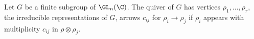 \begin{dfn}[\mc Quiver]
Let $G$ be a finite subgroup of $\GL_n(\C)$. The \mc quiver of $G$ has vertices $\rho_1,\ldots,\rho_r$, the irreducible representations of $G$, arrows $c_{ij}$ for $\rho_i \to \rho_j$ if $\rho_i$ appears with multiplicity $c_{ij}$ in $\rho \otimes \rho_j$. 
\end{dfn}














































